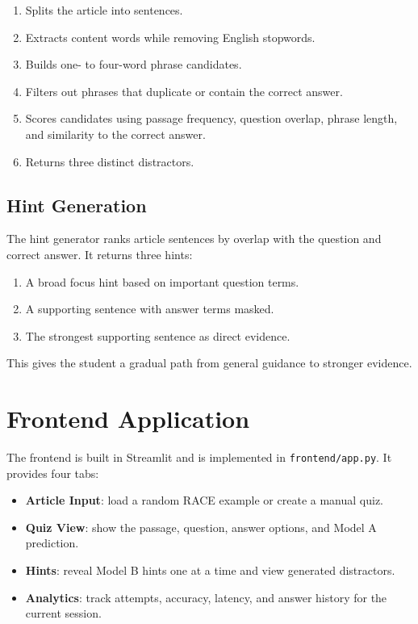 \documentclass[12pt,a4paper]{article}
\begin{document}
\begin{enumerate}
    \item Splits the article into sentences.
    \item Extracts content words while removing English stopwords.
    \item Builds one- to four-word phrase candidates.
    \item Filters out phrases that duplicate or contain the correct answer.
    \item Scores candidates using passage frequency, question overlap, phrase
    length, and similarity to the correct answer.
    \item Returns three distinct distractors.
\end{enumerate}

\subsection{Hint Generation}

The hint generator ranks article sentences by overlap with the question and
correct answer. It returns three hints:

\begin{enumerate}
    \item A broad focus hint based on important question terms.
    \item A supporting sentence with answer terms masked.
    \item The strongest supporting sentence as direct evidence.
\end{enumerate}

This gives the student a gradual path from general guidance to stronger
evidence.

\section{Frontend Application}

The frontend is built in Streamlit and is implemented in
\texttt{frontend/app.py}. It provides four tabs:

\begin{itemize}
    \item \textbf{Article Input}: load a random RACE example or create a manual
    quiz.
    \item \textbf{Quiz View}: show the passage, question, answer options, and
    Model A prediction.
    \item \textbf{Hints}: reveal Model B hints one at a time and view generated
    distractors.
    \item \textbf{Analytics}: track attempts, accuracy, latency, and answer
    history for the current session.
\end{itemize}
\end{document}
